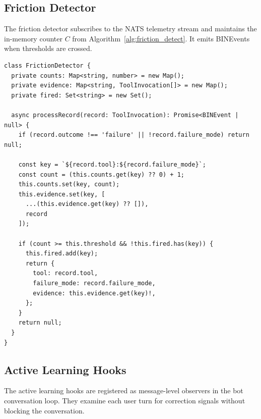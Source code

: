 \subsection{Friction Detector}

The friction detector subscribes to the NATS telemetry stream and maintains
the in-memory counter $C$ from Algorithm~\ref{alg:friction_detect}. It
emits BINEvents when thresholds are crossed.

\begin{verbatim}
class FrictionDetector {
  private counts: Map<string, number> = new Map();
  private evidence: Map<string, ToolInvocation[]> = new Map();
  private fired: Set<string> = new Set();

  async processRecord(record: ToolInvocation): Promise<BINEvent | null> {
    if (record.outcome !== 'failure' || !record.failure_mode) return null;

    const key = `${record.tool}:${record.failure_mode}`;
    const count = (this.counts.get(key) ?? 0) + 1;
    this.counts.set(key, count);
    this.evidence.set(key, [
      ...(this.evidence.get(key) ?? []),
      record
    ]);

    if (count >= this.threshold && !this.fired.has(key)) {
      this.fired.add(key);
      return {
        tool: record.tool,
        failure_mode: record.failure_mode,
        evidence: this.evidence.get(key)!,
      };
    }
    return null;
  }
}
\end{verbatim}

\subsection{Active Learning Hooks}

The active learning hooks are registered as message-level observers in the
bot conversation loop. They examine each user turn for correction signals
without blocking the conversation.


